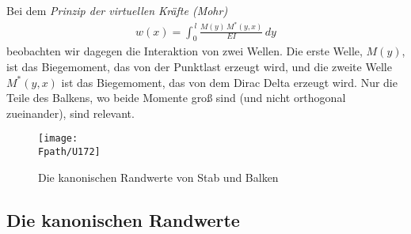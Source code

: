 {{{{\begin{remark}
Bei dem {\em Prinzip der virtuellen Kr\"{a}fte (Mohr)\/}
\begin{align}
w(x) = \int_0^{\,l} \frac{M(y)\,M^*(y,x)}{EI}\,dy
\end{align}
beobachten wir dagegen die Interaktion von zwei Wellen. Die erste Welle, $M(y)$, ist das Biegemoment, das von der Punktlast erzeugt wird, und die zweite Welle $M^*(y,x)$ ist das Biegemoment, das von dem Dirac Delta erzeugt wird. Nur die Teile des Balkens, wo beide Momente gro{\ss} sind (und nicht orthogonal zueinander), sind relevant. \\
\end{remark}

\begin{figure}[tbp]
\centering
\if {} \sidecaption \fi
\texttt{[image: \\Fpath/U172]}
\caption{Die kanonischen Randwerte von Stab und Balken} \label{U172}
\end{figure}%


{\textcolor{sectionTitleBlue}{\section{Die kanonischen Randwerte}}}

}}}}
